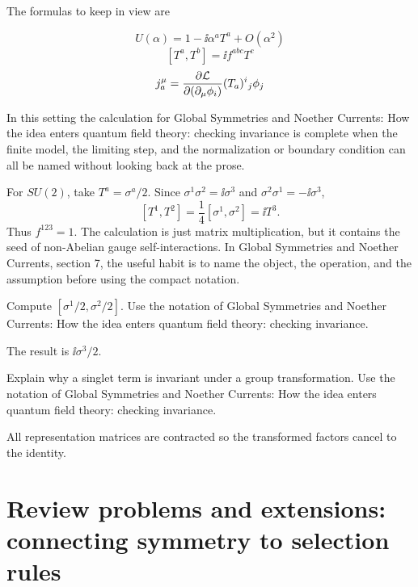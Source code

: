 The formulas to keep in view are

\[
  U(\alpha)=1-\ii\alpha^aT^a+O(\alpha^2)
\]
\[
  [T^a,T^b]=\ii f^{abc}T^c
\]
\[
  j^\mu_a=\frac{\partial\mathcal L}{\partial(\partial_\mu\phi_i)}(T_a)^i{}_j\phi_j
\]

In this setting the calculation for Global Symmetries and Noether Currents: How the idea enters quantum field theory: checking invariance is complete when the finite model, the limiting step, and the normalization or boundary condition can all be named without looking back at the prose.




\begin{example}
For \(SU(2)\), take \(T^a=\sigma^a/2\).  Since \(\sigma^1\sigma^2=\ii\sigma^3\) and \(\sigma^2\sigma^1=-\ii\sigma^3\),
\[
  [T^1,T^2]=\frac14[\sigma^1,\sigma^2]=\ii T^3.
\]
Thus \(f^{123}=1\).  The calculation is just matrix multiplication, but it contains the seed of non-Abelian gauge self-interactions.  In Global Symmetries and Noether Currents, section 7, the useful habit is to name the object, the operation, and the assumption before using the compact notation.
\end{example}



\begin{exercise}
Compute \([\sigma^1/2,\sigma^2/2]\).  Use the notation of Global Symmetries and Noether Currents: How the idea enters quantum field theory: checking invariance.
\begin{answer}
The result is \(\ii\sigma^3/2\).
\end{answer}
\end{exercise}

\begin{exercise}
Explain why a singlet term is invariant under a group transformation.  Use the notation of Global Symmetries and Noether Currents: How the idea enters quantum field theory: checking invariance.
\begin{answer}
All representation matrices are contracted so the transformed factors cancel to the identity.
\end{answer}
\end{exercise}



\section{Review problems and extensions: connecting symmetry to selection rules}

